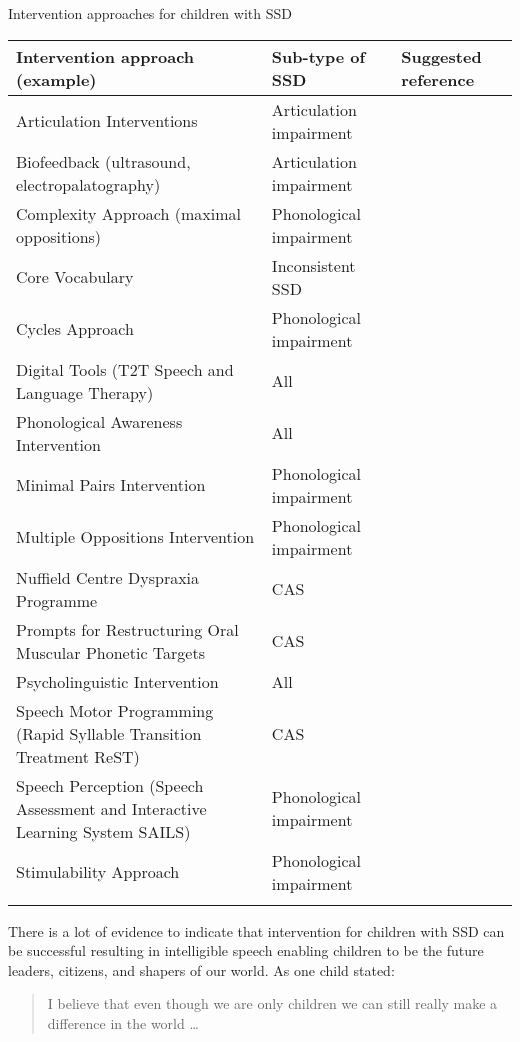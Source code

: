 \documentclass[output=paper,colorlinks,citecolor=brown]{langscibook}
\begin{document}
\begin{otherlanguage}{english}
\begin{tableeng}
\small
\caption{Intervention approaches for children with SSD}
    \label{tab:cap1tab3}
\begin{tabularx}{\textwidth}{QlQ}
\lsptoprule
\textbf{Intervention approach (example)}&	\textbf{Sub-type of  SSD}& 	\textbf{Suggested reference}  \\
\midrule
Articulation Interventions& 	Articulation impairment&	\citet{Skelton2004}\\
\tablevspace
Biofeedback (ultrasound, electropalatography)&	Articulation impairment&	\citet{Preston2014}\\
\tablevspace
Complexity Approach (maximal oppositions)&	Phonological impairment&	\citet{Rvachew2001}\\
\tablevspace
Core Vocabulary	&Inconsistent SSD&	\citet{Broomfield2011}\\
\tablevspace
Cycles Approach&	Phonological impairment&	\citet{Almost1998}\\
\tablevspace
Digital Tools (T2T Speech and Language Therapy)&	All&	\citet{Jesus2019}\\
\tablevspace
Phonological Awareness Intervention&	All&	\citet{Hesketh2007}\\
\tablevspace
Minimal Pairs Intervention&	Phonological impairment&	\citet{Dodd2008a}\\
\tablevspace
Multiple Oppositions Intervention&	Phonological impairment&	\citet{Ceron2013}\\
\tablevspace
Nuffield Centre Dyspraxia Programme	&CAS&	\citet{Murray2015}\\
\tablevspace
Prompts for Restructuring Oral Muscular Phonetic Targets &	CAS&	\citet{Namasivayam2020a}\\
\tablevspace
Psycholinguistic Intervention&	All&	\citet{Speake2012}\\
\tablevspace
Speech Motor Programming (Rapid Syllable Transition Treatment ReST)&	CAS&	\citet{Murray2015}\\
\tablevspace
Speech Perception (Speech Assessment and Interactive Learning System SAILS)&	Phonological impairment&	\citet{Rvachew2004}\\
\tablevspace
Stimulability Approach&	Phonological impairment&	\citet{Miccio1996}\\
\lspbottomrule
\end{tabularx}
    \parbox{\textwidth}{\raggedright\footnotesize{}}
\end{tableeng}
\clearpage

There is a lot of evidence to indicate that intervention for children with SSD can be successful resulting in intelligible speech \citep{Baker2011} enabling children to be the future leaders, citizens, and shapers of our world. As one child stated:

\begin{quote}
  I believe that even though we are only children we can still really make a difference in the world {\ldots} \citep[147]{McCormack2018}
\end{quote}


\end{otherlanguage}
{\sloppy\printbibliography[heading=subbibliography,notkeyword=this]}
\end{document}
